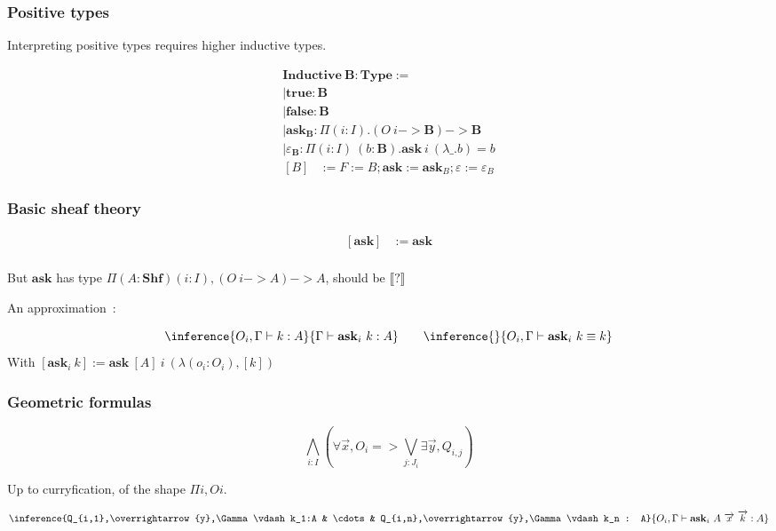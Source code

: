 \documentclass{beamer}
\newcommand{\0}{\boldsymbol{0}}
\newcommand{\1}{\boldsymbol{1}}
\begin{document}
\begin{frame}
    \frametitle{Positive types}
    Interpreting positive types requires higher inductive types.
    
$$
\begin{array}{l}
    \mathbf{Inductive}\ \mathbf{B} : \mathbf{Type} := \\
    \mid \mathbf{true} : \mathbf{B}\\
    \mid \mathbf{false} : \mathbf{B}\\
    \mid \mathbf{ask}_{\mathbf{B}} : \Pi (i:I). (O\ i -> \mathbf{B}) -> \mathbf{B}\\
    \mid \varepsilon_\mathbf{B} : \Pi (i:I)\ (b : \mathbf B). \mathbf{ask}\ i\ (\lambda \_. b) = b
\end{array}
$$
$$
\begin{array}{rl}
    [B] &:={F:= B; \mathbf{ask}:=\mathbf{ask}_B;\varepsilon := \varepsilon_B}
\end{array}
$$

\end{frame}

\begin{frame}
    \frametitle{Basic sheaf theory}

    $$\begin{array}{rl}
        [\mathbf{ask}] &:= \mathbf{ask}\\
    \end{array}$$

    But $\mathbf{ask}$ has type  $\Pi (A : \mathbf{Shf}) (i:I), (O\ i -> A ) -> A$, should be $\llbracket ? \rrbracket$
    \vspace{1cm}

    An approximation~:

    $$\inference{O_i,\Gamma\vdash k : A}{\Gamma\vdash \mathbf{ask}_i\ k : A}\qquad \inference{}{O_i,\Gamma\vdash \mathbf{ask}_i\ k \equiv k}$$
    With $[\mathbf{ask}_i\ k] := \mathbf{ask}\ [A]\ i\ (\lambda (o_i: O_i), [k])$
\end{frame}

\begin{frame}
    \frametitle{Geometric formulas}

    $$\bigwedge_{i : I}\left(\forall \overrightarrow{x}, O_i => \bigvee_{j : J_i}\exists \overrightarrow{y}, Q_{i,j}\right)$$
    \vspace{0.5cm}

    Up to curryfication, of the shape $\Pi i, O i$.


    $$ \inference{Q_{i,1},\overrightarrow{y},\Gamma\vdash k_1:A & \cdots & Q_{i,n},\overrightarrow{y},\Gamma\vdash k_n : A}{O_i,\Gamma\vdash \mathbf{ask}_i\ A\ \overrightarrow{x}\ \overrightarrow{k} : A}$$
\end{frame}
\end{document}
